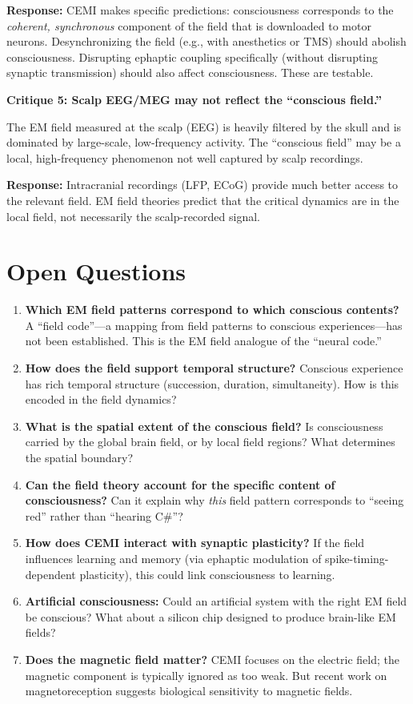 \documentclass[11pt,a4paper]{report}
\begin{document}
\textbf{Response:} CEMI makes specific predictions: consciousness corresponds to the \emph{coherent, synchronous} component of the field that is downloaded to motor neurons. Desynchronizing the field (e.g., with anesthetics or TMS) should abolish consciousness. Disrupting ephaptic coupling specifically (without disrupting synaptic transmission) should also affect consciousness. These are testable.

\textbf{Critique 5: Scalp EEG/MEG may not reflect the ``conscious field.''}

The EM field measured at the scalp (EEG) is heavily filtered by the skull and is dominated by large-scale, low-frequency activity. The ``conscious field'' may be a local, high-frequency phenomenon not well captured by scalp recordings.

\textbf{Response:} Intracranial recordings (LFP, ECoG) provide much better access to the relevant field. EM field theories predict that the critical dynamics are in the local field, not necessarily the scalp-recorded signal.

\section{Open Questions}

\begin{enumerate}[leftmargin=2em]
  \item \textbf{Which EM field patterns correspond to which conscious contents?} A ``field code''---a mapping from field patterns to conscious experiences---has not been established. This is the EM field analogue of the ``neural code.''
  \item \textbf{How does the field support temporal structure?} Conscious experience has rich temporal structure (succession, duration, simultaneity). How is this encoded in the field dynamics?
  \item \textbf{What is the spatial extent of the conscious field?} Is consciousness carried by the global brain field, or by local field regions? What determines the spatial boundary?
  \item \textbf{Can the field theory account for the specific content of consciousness?} Can it explain why \emph{this} field pattern corresponds to ``seeing red'' rather than ``hearing C\#''?
  \item \textbf{How does CEMI interact with synaptic plasticity?} If the field influences learning and memory (via ephaptic modulation of spike-timing-dependent plasticity), this could link consciousness to learning.
  \item \textbf{Artificial consciousness:} Could an artificial system with the right EM field be conscious? What about a silicon chip designed to produce brain-like EM fields?
  \item \textbf{Does the magnetic field matter?} CEMI focuses on the electric field; the magnetic component is typically ignored as too weak. But recent work on magnetoreception suggests biological sensitivity to magnetic fields.
\end{enumerate}
\end{document}
